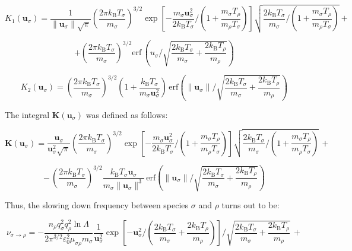 \begin{equation}
    K_1(\mathbf{u}_\sigma)=\frac{1}{\|\mathbf{u}_\sigma\|\sqrt{\pi}}\left(\frac{2\pi k_\mathrm{B}T_\sigma}{m_\sigma}\right)^{3/2}\exp{\left[-\frac{m_\sigma\mathbf{u}_\sigma^2}{2k_\mathrm{B}T_\sigma}\bigg/\left(1+\frac{m_\sigma T_\rho}{m_\rho T_\sigma}\right)\right]}\sqrt{\frac{2k_\mathrm{B}T_\sigma}{m_\sigma}\Big/\left(1+\frac{m_\sigma T_\rho}{m_\rho T_\sigma}\right)}+
\end{equation}

\begin{equation}
    +\left(\frac{2\pi k_\mathrm{B}T_\sigma}{m_\sigma}\right)^{3/2}\text{erf}\,\left(u_\sigma\bigg/\sqrt{\frac{2k_\mathrm{B}T_\sigma}{m_\sigma}+\frac{2k_\mathrm{B}T_\rho}{m_\rho}}\right)
\end{equation}

\begin{equation}
    K_2(\mathbf{u}_\sigma)=\left(\frac{2\pi k_\mathrm{B}T_\sigma}{m_\sigma}\right)^{3/2}\left(1+\frac{k_\mathrm{B}T_\sigma}{m_\sigma \mathbf{u}_\sigma^2}\right)\,\text{erf}\left(\|\mathbf{u}_\sigma\|\bigg/\sqrt{\frac{2k_\mathrm{B}T_\sigma}{m_\sigma}+\frac{2k_\mathrm{B}T_\rho}{m_\rho}}\right)
\end{equation}

The integral $\mathbf{K}(\mathbf{u}_\sigma)$ was defined as follows:

\begin{equation}
    \mathbf{K}(\mathbf{u}_\sigma)=\frac{\mathbf{u}_\sigma}{\mathbf{u}_\sigma^2\sqrt{\pi}}\left(\frac{2\pi k_\mathrm{B}T_\sigma}{m_\sigma}\right)^{3/2}\exp{\left[-\frac{m_\sigma\mathbf{u}_\sigma^2}{2k_\mathrm{B}T_\sigma}\bigg/\left(1+\frac{m_\sigma T_\rho}{m_\rho T_\sigma}\right)\right]}\sqrt{\frac{2k_\mathrm{B}T_\sigma}{m_\sigma}\Big/\left(1+\frac{m_\sigma T_\rho}{m_\rho T_\sigma}\right)}\,+
\end{equation}

\begin{equation}
    -\,\left(\frac{2\pi k_\mathrm{B}T_\sigma}{m_\sigma}\right)^{3/2}\frac{k_\mathrm{B}T_\sigma\mathbf{u}_\sigma}{m_\sigma\|\mathbf{u}_\sigma\|^3}\,\text{erf}\left(\|\mathbf{u}_\sigma\|\bigg/\sqrt{\frac{2k_\mathrm{B}T_\sigma}{m_\sigma}+\frac{2k_\mathrm{B}T_\rho}{m_\rho}}\right)
\end{equation}

Thus, the slowing down frequency between species $\sigma$ and $\rho$ turns out to be:

\begin{equation*}
    \nu_{\sigma\to\rho}=-\frac{n_\rho q_\sigma^2q_\rho^2\ln{\Lambda}}{2\pi^{3/2}\varepsilon_0^2\mu_{\sigma\rho}m_\sigma}\frac{1}{\mathbf{u}_\sigma^2}\exp{\left[-\mathbf{u}_\sigma^2\bigg/\left(\frac{2k_\mathrm{B}T_\sigma}{m_\sigma}+\frac{2k_\mathrm{B}T_\rho}{m_\rho}\right)\right]}\bigg/\sqrt{\frac{2k_\mathrm{B}T_\sigma}{m_\sigma}+\frac{2k_\mathrm{B}T_\rho}{m_\rho}}\,+
\end{equation*}


